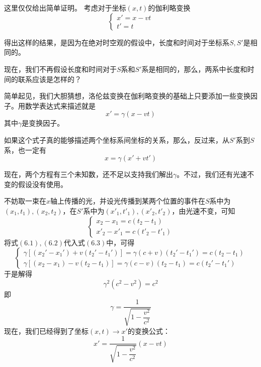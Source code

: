 \chapter[狭义相对论]{}
\begin{prove}
	这里仅仅给出简单证明。
	考虑对于坐标$(x,t)$的伽利略变换
	\[\left\{
	\begin{array}{l}
		x'=x-vt\\
		t'=t
	\end{array}
	\right.\]
	
	得出这样的结果，是因为在绝对时空观的假设中，长度和时间对于坐标系$S,S'$是相同的。
	
	现在，我们不再假设长度和时间对于$S$系和$S'$系是相同的，那么，两系中长度和时间的联系应该是怎样的？
	
	简单起见，我们大胆猜想，洛伦兹变换在伽利略变换的基础上只要添加一些变换因子。用数学表达式来描述就是
	\begin{equation}
		x'=\gamma(x-vt)
	\end{equation}
	其中$\gamma$是变换因子。
	
	如果这个式子真的能够描述两个坐标系间坐标的关系，那么，反过来，从$S'$系到$S$系，也一定有
	\begin{equation}
		x=\gamma(x'+vt')
	\end{equation}
	
	现在，两个方程有三个未知数，还不足以支持我们解出$\gamma$。不过，我们还有光速不变的假设没有使用。
	
	不妨取一束在$x$轴上传播的光，并设光传播到某两个位置的事件在$S$系中为$(x_1,t_1),(x_2,t_2)$，在$S'$系中为$(x'_1,t'_1),(x'_2,t'_2)$，由光速不变，可知
	\begin{equation}
		\left\{
			\begin{array}{l}
				x_2-x_1=c(t_2-t_1)\\
				x'_2-x'_1=c(t'_2-t'_1)
			\end{array}
		\right.
	\end{equation}
	将式$(6.1),(6.2)$代入式$(6.3)$中，可得
	\begin{equation}
		\left\{
		\begin{array}{l}
			\gamma[(x_2'-x_1')+v(t_2'-t_1')]=\gamma(c+v)(t_2'-t_1')=c(t_2-t_1)\\
			\gamma[(x_2-x_1)-v(t_2-t_1)]=\gamma(c-v)(t_2-t_1)=c(t_2'-t_1')
		\end{array}
		\right.
	\end{equation}
	于是解得
	\[\gamma^2(c^2-v^2)=c^2\]
	即
	\begin{equation}
		\gamma = \dfrac{1}{\sqrt{1-\dfrac{v^2}{c^2}}}
	\end{equation}
	现在，我们已经得到了坐标$(x,t)\rightarrow x'$的变换公式：
	\begin{equation}
		x'=\dfrac{1}{\sqrt{1-\dfrac{v^2}{c^2}}}(x-vt)
	\end{equation}
	

\end{prove}
